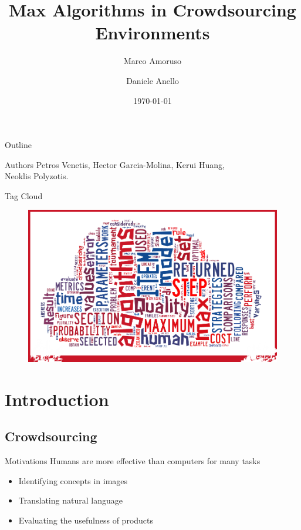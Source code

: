 \documentclass{beamer}
\title[Max Algorithms in Crowdsourcing Environments]{Max Algorithms in Crowdsourcing Environments}
\author{
  Marco Amoruso
  \and
  Daniele Anello
}
\institute{University of Salerno, department of computer science}
\date{\today}
\begin{document}
\begin{frame}
  \titlepage
\end{frame}

\begin{frame}{Outline}
  \tableofcontents[hideallsubsections]
\end{frame}

\begin{frame}{}
	\begin{block}{Authors}
		Petros Venetis, Hector Garcia-Molina, Kerui Huang,\\Neoklis Polyzotis.\\
	\end{block}
\end{frame}

\begin{frame}{Tag Cloud}
	\begin{figure}
	\centering
	\includegraphics[scale=0.305]{images/tc.png}
	\end{figure}
\end{frame}

\section{Introduction}
\subsection{Crowdsourcing}
\begin{frame}{Motivations}
	Humans are more effective than computers for many tasks
	\begin{itemize}
	   \pause
		\item Identifying concepts in images
		\pause
		\item Translating natural language
		\pause
		\item Evaluating the usefulness of products
	\end{itemize}
\end{frame}
\end{document}
